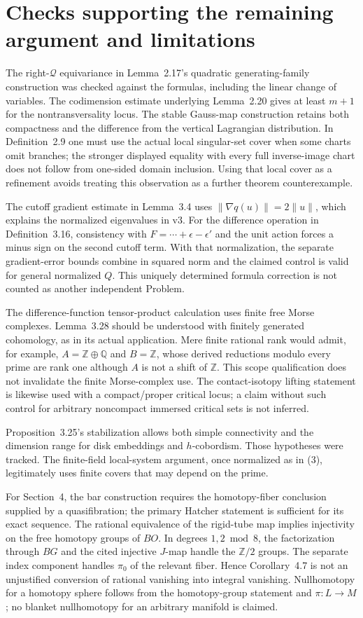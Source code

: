 \documentclass[10pt]{article}
\begin{document}
\section*{Checks supporting the remaining argument and limitations}
The right-\(\mathcal Q\) equivariance in Lemma 2.17’s quadratic generating-family construction was checked against the formulas, including the linear change of variables. The codimension estimate underlying Lemma 2.20 gives at least \(m+1\) for the nontransversality locus. The stable Gauss-map construction retains both compactness and the difference from the vertical Lagrangian distribution. In Definition 2.9 one must use the actual local singular-set cover when some charts omit branches; the stronger displayed equality with every full inverse-image chart does not follow from one-sided domain inclusion. Using that local cover as a refinement avoids treating this observation as a further theorem counterexample.\par
The cutoff gradient estimate in Lemma 3.4 uses \(\|\nabla q(u)\|=2\|u\|\), which explains the normalized eigenvalues in v3. For the difference operation in Definition 3.16, consistency with \(F=\cdots+\epsilon-\epsilon'\) and the unit action forces a minus sign on the second cutoff term. With that normalization, the separate gradient-error bounds combine in squared norm and the claimed control is valid for general normalized \(Q\). This uniquely determined formula correction is not counted as another independent Problem.\par
The difference-function tensor-product calculation uses finite free Morse complexes. Lemma 3.28 should be understood with finitely generated cohomology, as in its actual application. Mere finite rational rank would admit, for example, \(A=\mathbb Z\oplus\mathbb Q\) and \(B=\mathbb Z\), whose derived reductions modulo every prime are rank one although \(A\) is not a shift of \(\mathbb Z\). This scope qualification does not invalidate the finite Morse-complex use. The contact-isotopy lifting statement is likewise used with a compact/proper critical locus; a claim without such control for arbitrary noncompact immersed critical sets is not inferred.\par
Proposition 3.25’s stabilization allows both simple connectivity and the dimension range for disk embeddings and \(h\)-cobordism. Those hypotheses were tracked. The finite-field local-system argument, once normalized as in (3), legitimately uses finite covers that may depend on the prime.\par
For Section 4, the bar construction requires the homotopy-fiber conclusion supplied by a quasifibration; the primary Hatcher statement is sufficient for its exact sequence. The rational equivalence of the rigid-tube map implies injectivity on the free homotopy groups of \(BO\). In degrees \(1,2\bmod8\), the factorization through \(BG\) and the cited injective \(J\)-map handle the \(\mathbb Z/2\) groups. The separate index component handles \(\pi_0\) of the relevant fiber. Hence Corollary 4.7 is not an unjustified conversion of rational vanishing into integral vanishing. Nullhomotopy for a homotopy sphere follows from the homotopy-group statement and \(\pi:L\to M\); no blanket nullhomotopy for an arbitrary manifold is claimed.\par
\end{document}
